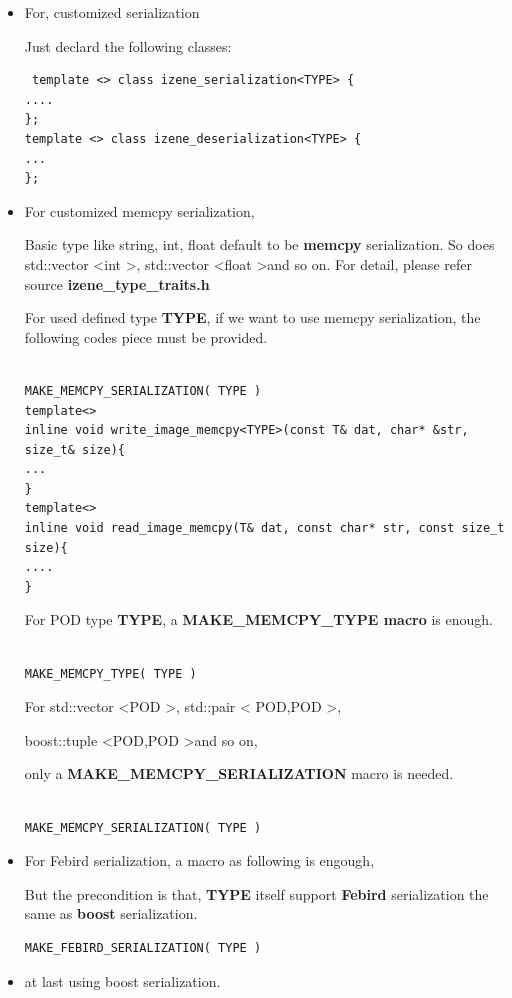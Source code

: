 \documentclass[a4paper,10pt]{article}
\begin{document}
\begin{itemize}
\item For, customized serialization

Just declard the following classes:
\begin{lstlisting}
 template <> class izene_serialization<TYPE> {
....
};
template <> class izene_deserialization<TYPE> {
...
};
\end{lstlisting}
\item For customized memcpy serialization,

Basic type like string, int, float default to be \textbf{memcpy}
serialization. So does std::vector \textless int \textgreater ,
std::vector \textless float \textgreater and so on. For detail,
  please refer source \textbf{izene\_type\_traits.h}


For used defined type \textbf{TYPE}, if we want to use memcpy serialization, the following codes
piece must be provided.

\begin{lstlisting}

MAKE_MEMCPY_SERIALIZATION( TYPE )
template<>
inline void write_image_memcpy<TYPE>(const T& dat, char* &str, size_t& size){
...
}
template<>
inline void read_image_memcpy(T& dat, const char* str, const size_t size){
....
}
\end{lstlisting}

For POD type \textbf{TYPE}, a \textbf{MAKE\_MEMCPY\_TYPE macro} is
enough.

\begin{lstlisting}

MAKE_MEMCPY_TYPE( TYPE )

\end{lstlisting}

For std::vector \textless POD \textgreater, std::pair \textless
POD,POD \textgreater,

boost::tuple \textless POD,POD \textgreater and so on,

only a \textbf{MAKE\_MEMCPY\_SERIALIZATION} macro is needed.

\begin{lstlisting}

MAKE_MEMCPY_SERIALIZATION( TYPE )

\end{lstlisting}

\item For Febird serialization, a macro as following is engough,

But the precondition is that, \textbf{TYPE} itself support
\textbf{Febird} serialization the same as \textbf{boost}
serialization.
\begin{lstlisting}
MAKE_FEBIRD_SERIALIZATION( TYPE )
\end{lstlisting}

\item at last using boost serialization.
\end{itemize}
\end{document}
